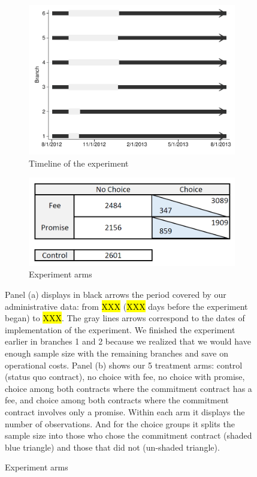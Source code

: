 \documentclass[11pt]{article}
\begin{document}
\begin{figure}[H]
     \caption{Experiment description}
    \label{exp_description}
    \begin{center}
    \begin{subfigure}{.50\textwidth}
      \caption{Timeline of the experiment}
        \centering
        \includegraphics[width=\textwidth]{Figuras/timeline_suc_exp_extended.pdf}
    \end{subfigure}
    \begin{subfigure}{0.45\textwidth}
    \caption{Experiment arms}
       \centering
      \includegraphics[width=\textwidth]{Figuras/exp_arms.PNG}
    \end{subfigure}
    \end{center}
         \scriptsize Panel (a) displays in black arrows the period covered by our administrative data: from \hl{XXX} (\hl{XXX} days before the experiment began) to \hl{XXX}. The gray lines arrows correspond to the dates of implementation of the experiment. We finished the experiment earlier in branches 1 and 2 because we realized that we would have enough sample size with the remaining branches and save on operational costs. Panel (b) shows our 5 treatment arms: control (status quo contract), no choice with fee, no choice with promise, choice among both contracts where the commitment contract has a fee, and choice among both contracts where the commitment contract involves only a promise. Within each arm it displays the number of observations. And  for the choice groups it splits the sample size into those who chose the commitment contract (shaded blue triangle) and those that did not (un-shaded triangle).
\end{figure}
\end{document}
